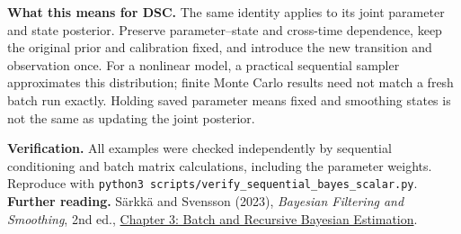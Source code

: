 \documentclass[10pt,a4paper]{article}
\begin{document}
\textbf{What this means for DSC.} The same identity applies to its joint parameter and
state posterior. Preserve parameter--state and cross-time dependence, keep the original
prior and calibration fixed, and introduce the new transition and observation once.
For a nonlinear model, a practical sequential sampler approximates this distribution;
finite Monte Carlo results need not match a fresh batch run exactly. Holding saved parameter
means fixed and smoothing states is not the same as updating the joint posterior.

{\footnotesize\textbf{Verification.} All examples were checked independently by sequential
conditioning and batch matrix calculations, including the parameter weights.
Reproduce with \texttt{python3 scripts/verify\_sequential\_bayes\_scalar.py}.
\textbf{Further reading.} S\"arkk\"a and Svensson (2023),
\emph{Bayesian Filtering and Smoothing}, 2nd ed.,
\href{https://www.cambridge.org/core/books/abs/bayesian-filtering-and-smoothing/batch-and-recursive-bayesian-estimation/720DF1C5D896F74B03921B0FB4E020B1}{Chapter 3: Batch and Recursive Bayesian Estimation}.
}
\end{document}
